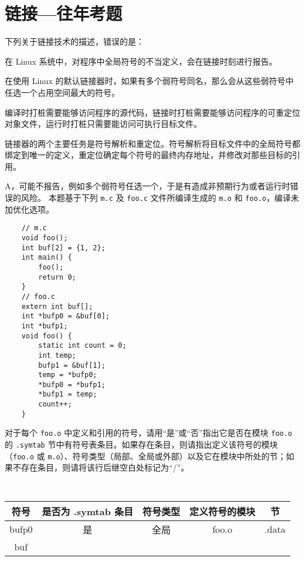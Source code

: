\chapter{链接{---}往年考题}
    \begin{problems}
         下列关于链接技术的描述，错误的是：
        \begin{choices}
            \item 在 Linux 系统中，对程序中全局符号的不当定义，会在链接时刻进行报告。
            \item 在使用 Linux 的默认链接器时，如果有多个弱符号同名，那么会从这些弱符号中任选一个占用空间最大的符号。
            \item 编译时打桩需要能够访问程序的源代码，链接时打桩需要能够访问程序的可重定位对象文件，运行时打桩只需要能访问可执行目标文件。
            \item 链接器的两个主要任务是符号解析和重定位。符号解析将目标文件中的全局符号都绑定到唯一的定义，重定位确定每个符号的最终内存地址，并修改对那些目标的引用。
        \end{choices}
        \sol A，可能不报告，例如多个弱符号任选一个，于是有造成非预期行为或者运行时错误的风险。
         本题基于下列 \verb|m.c| 及 \verb|foo.c| 文件所编译生成的 \verb|m.o| 和 \verb|foo.o|，编译未加优化选项。
        \begin{verbatim}
    // m.c
    void foo();
    int buf[2] = {1, 2};
    int main() {
        foo();
        return 0;
    }
    // foo.c
    extern int buf[];
    int *bufp0 = &buf[0];
    int *bufp1;
    void foo() {
        static int count = 0;
        int temp;
        bufp1 = &buf[1];
        temp = *bufp0;
        *bufp0 = *bufp1;
        *bufp1 = temp;
        count++;
    }
        \end{verbatim}
        \qn 对于每个 \verb|foo.o| 中定义和引用的符号，请用“是”或“否”指出它是否在模块 \verb|foo.o| 的 \verb|.symtab| 节中有符号表条目。如果存在条目，则请指出定义该符号的模块（\verb|foo.o| 或 \verb|m.o|）、符号类型（局部、全局或外部）以及它在模块中所处的节；如果不存在条目，则请将该行后继空白处标记为“/”。
        \begin{table}[H]
            \tt
            \centering
            \begin{tabular}{|c|c|c|c|c|}
                \hline
                符号 & 是否为 .symtab 条目 & 符号类型 & 定义符号的模块 & 节 \\ \hline
                bufp0 & 是 & 全局 & foo.o & .data \\ \hline
                buf &  &  &  &  \\ \hline

\end{tabular}
\end{table}
\end{problems}
